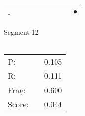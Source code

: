 \documentclass[landscape]{article}
\newcommand{\ssp}{\hspace{2pt}}
\newcommand{\mex}{\cellcolor{g}$\bullet$}
\begin{document}
\begin{tabular}{|l|p{10pt}|p{10pt}|p{10pt}|p{10pt}|p{10pt}|p{10pt}|p{10pt}|p{10pt}|}
\hline
\ssp \cellcolor{ref7}. \ssp&\hspace{2pt}&\hspace{2pt}&\hspace{2pt}&\hspace{2pt}&\hspace{2pt}&\hspace{2pt}&\hspace{2pt}&\hspace{2pt}\mex\\
\hline
\end{tabular}

\vspace{6pt}
\noindent Segment 12\\\\
\noindent\begin{tabular}{lm{12pt}r}
\hline
P:&&0.105\\
R:&&0.111\\
Frag:&&0.600\\
Score:&&0.044\\
\end{tabular}

\newpage
\end{document}
